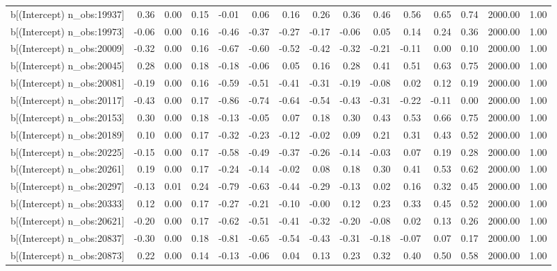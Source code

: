 \begin{table}[ht]
\begin{tabular}{rrrrrrrrrrrrrrr}
  b[(Intercept) n\_obs:19937] & 0.36 & 0.00 & 0.15 & -0.01 & 0.06 & 0.16 & 0.26 & 0.36 & 0.46 & 0.56 & 0.65 & 0.74 & 2000.00 & 1.00 \\ 
  b[(Intercept) n\_obs:19973] & -0.06 & 0.00 & 0.16 & -0.46 & -0.37 & -0.27 & -0.17 & -0.06 & 0.05 & 0.14 & 0.24 & 0.36 & 2000.00 & 1.00 \\ 
  b[(Intercept) n\_obs:20009] & -0.32 & 0.00 & 0.16 & -0.67 & -0.60 & -0.52 & -0.42 & -0.32 & -0.21 & -0.11 & 0.00 & 0.10 & 2000.00 & 1.00 \\ 
  b[(Intercept) n\_obs:20045] & 0.28 & 0.00 & 0.18 & -0.18 & -0.06 & 0.05 & 0.16 & 0.28 & 0.41 & 0.51 & 0.63 & 0.75 & 2000.00 & 1.00 \\ 
  b[(Intercept) n\_obs:20081] & -0.19 & 0.00 & 0.16 & -0.59 & -0.51 & -0.41 & -0.31 & -0.19 & -0.08 & 0.02 & 0.12 & 0.19 & 2000.00 & 1.00 \\ 
  b[(Intercept) n\_obs:20117] & -0.43 & 0.00 & 0.17 & -0.86 & -0.74 & -0.64 & -0.54 & -0.43 & -0.31 & -0.22 & -0.11 & 0.00 & 2000.00 & 1.00 \\ 
  b[(Intercept) n\_obs:20153] & 0.30 & 0.00 & 0.18 & -0.13 & -0.05 & 0.07 & 0.18 & 0.30 & 0.43 & 0.53 & 0.66 & 0.75 & 2000.00 & 1.00 \\ 
  b[(Intercept) n\_obs:20189] & 0.10 & 0.00 & 0.17 & -0.32 & -0.23 & -0.12 & -0.02 & 0.09 & 0.21 & 0.31 & 0.43 & 0.52 & 2000.00 & 1.00 \\ 
  b[(Intercept) n\_obs:20225] & -0.15 & 0.00 & 0.17 & -0.58 & -0.49 & -0.37 & -0.26 & -0.14 & -0.03 & 0.07 & 0.19 & 0.28 & 2000.00 & 1.00 \\ 
  b[(Intercept) n\_obs:20261] & 0.19 & 0.00 & 0.17 & -0.24 & -0.14 & -0.02 & 0.08 & 0.18 & 0.30 & 0.41 & 0.53 & 0.62 & 2000.00 & 1.00 \\ 
  b[(Intercept) n\_obs:20297] & -0.13 & 0.01 & 0.24 & -0.79 & -0.63 & -0.44 & -0.29 & -0.13 & 0.02 & 0.16 & 0.32 & 0.45 & 2000.00 & 1.00 \\ 
  b[(Intercept) n\_obs:20333] & 0.12 & 0.00 & 0.17 & -0.27 & -0.21 & -0.10 & -0.00 & 0.12 & 0.23 & 0.33 & 0.45 & 0.52 & 2000.00 & 1.00 \\ 
  b[(Intercept) n\_obs:20621] & -0.20 & 0.00 & 0.17 & -0.62 & -0.51 & -0.41 & -0.32 & -0.20 & -0.08 & 0.02 & 0.13 & 0.26 & 2000.00 & 1.00 \\ 
  b[(Intercept) n\_obs:20837] & -0.30 & 0.00 & 0.18 & -0.81 & -0.65 & -0.54 & -0.43 & -0.31 & -0.18 & -0.07 & 0.07 & 0.17 & 2000.00 & 1.00 \\ 
  b[(Intercept) n\_obs:20873] & 0.22 & 0.00 & 0.14 & -0.13 & -0.06 & 0.04 & 0.13 & 0.23 & 0.32 & 0.40 & 0.50 & 0.58 & 2000.00 & 1.00 \\ 

\end{tabular}
\end{table}
